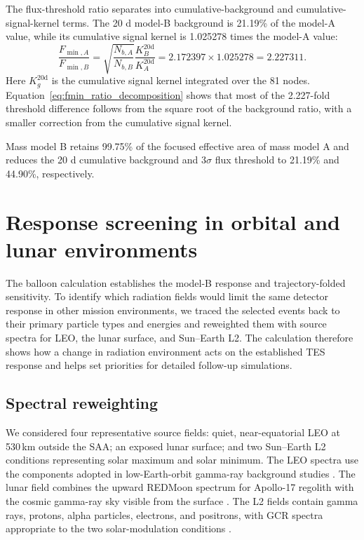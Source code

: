 \documentclass[11pt]{article}
\begin{document}
\FloatBarrier

The flux-threshold ratio separates into cumulative-background and cumulative-signal-kernel terms. The 20 d model-B background is 21.19\% of the model-A value, while its cumulative signal kernel is 1.025278 times the model-A value:
\begin{equation}
 \frac{F_{\min,A}}{F_{\min,B}}
 =\sqrt{\frac{N_{b,A}}{N_{b,B}}}\frac{K_B^{20\mathrm d}}{K_A^{20\mathrm d}}
 =2.172397\times1.025278
 =2.227311 .
 \label{eq:fmin_ratio_decomposition}
\end{equation}
Here $K_g^{20\mathrm d}$ is the cumulative signal kernel integrated over the 81 nodes. Equation~\eqref{eq:fmin_ratio_decomposition} shows that most of the 2.227-fold threshold difference follows from the square root of the background ratio, with a smaller correction from the cumulative signal kernel.

Mass model B retains 99.75\% of the focused effective area of mass model A and reduces the 20 d cumulative background and $3\sigma$ flux threshold to 21.19\% and 44.90\%, respectively.

\FloatBarrier

\section{Response screening in orbital and lunar environments}
\label{sec:environment_screening}

The balloon calculation establishes the model-B response and trajectory-folded
sensitivity. To identify which radiation fields would limit the same
detector response in other mission environments, we traced the selected events
back to their primary particle types and energies and reweighted them with
source spectra for LEO, the lunar surface, and Sun--Earth L2. The calculation
therefore shows how a change in radiation environment acts on the established
TES response and helps set priorities for detailed follow-up simulations.

\subsection{Spectral reweighting}

We considered four representative source fields: quiet, near-equatorial LEO at
530\,km outside the SAA; an exposed lunar surface; and two Sun--Earth L2
conditions representing solar maximum and solar minimum. The LEO spectra use
the components adopted in low-Earth-orbit gamma-ray background studies
\cite{Cumani2019LEO}. The lunar field combines the upward REDMoon spectrum for
Apollo-17 regolith with the cosmic gamma-ray sky visible from the surface
\cite{Dobynde2021REDMoon}. The L2 fields contain gamma rays, protons, alpha
particles, electrons, and positrons, with GCR spectra appropriate to the two
solar-modulation conditions
\cite{Lotti2021Athena,Usoskin2005,Kuznetsov2017}.
\end{document}
